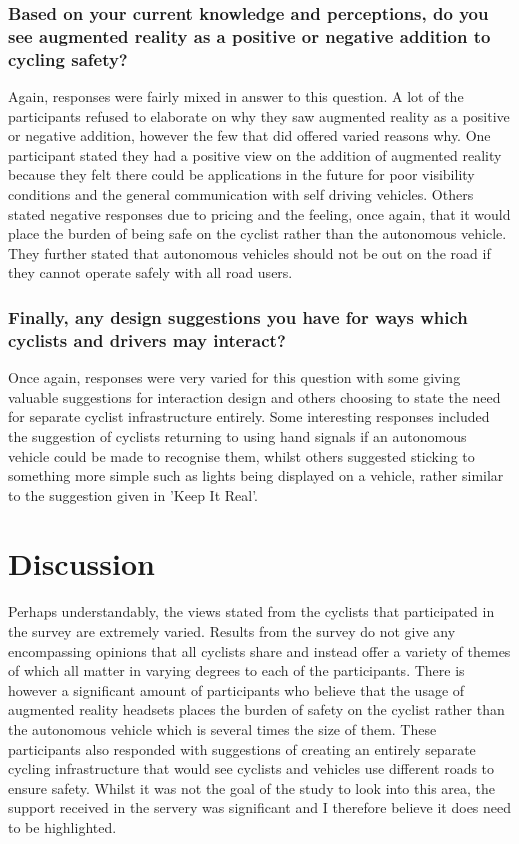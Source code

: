 \documentclass{l4proj}
\begin{document}
\subsubsection{Based on your current knowledge and perceptions, do you see augmented reality as a positive or negative addition to cycling safety?}

Again, responses were fairly mixed in answer to this question. A lot of the participants refused to elaborate on why they saw augmented reality as a positive or negative addition, however the few that did offered varied reasons why. One participant stated they had a positive view on the addition of augmented reality because they felt there could be applications in the future for poor visibility conditions and the general communication with self driving vehicles. Others stated negative responses due to pricing and the feeling, once again, that it would place the burden of being safe on the cyclist rather than the autonomous vehicle. They further stated that autonomous vehicles should not be out on the road if they cannot operate safely with all road users.

\subsubsection{Finally, any design suggestions you have for ways  which cyclists and drivers may interact?}

Once again, responses were very varied for this question with some giving valuable suggestions for interaction design and others choosing to state the need for separate cyclist infrastructure entirely. Some interesting responses included the suggestion of cyclists returning to using hand signals if an autonomous vehicle could be made to recognise them, whilst others suggested sticking to something more simple such as lights being displayed on a vehicle, rather similar to the suggestion given in 'Keep It Real'.

\section{Discussion}

Perhaps understandably, the views stated from the cyclists that participated in the survey are extremely varied. Results from the survey do not give any encompassing opinions that all cyclists share and instead offer a variety of themes of which all matter in varying degrees to each of the participants. There is however a significant amount of participants who believe that the usage of augmented reality headsets places the burden of safety on the cyclist rather than the autonomous vehicle which is several times the size of them. These participants also responded with suggestions of creating an entirely separate cycling infrastructure that would see cyclists and vehicles use different roads to ensure safety. Whilst it was not the goal of the study to look into this area, the support received in the servery was significant and I therefore believe it does need to be highlighted.
\end{document}
